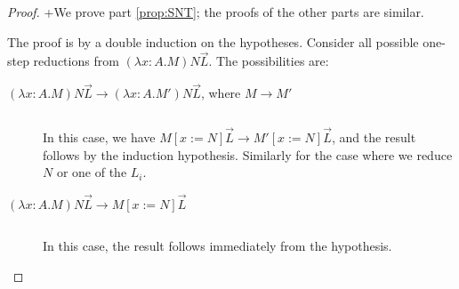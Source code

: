 \begin{proof}
+We prove part \ref{prop:SNT}; the proofs of the other parts are similar.

The proof is by a double induction on the hypotheses.  Consider all possible one-step reductions from $(\lambda x:A.M) N \vec{L}$.  The possibilities are:
\begin{description}
\item[$(\lambda x:A.M) N \vec{L} \rightarrow (\lambda x:A.M')N \vec{L}$, where $M \rightarrow M'$]
$ $

In this case, we have $M[x:=N] \vec{L} \rightarrow M'[x:=N] \vec{L}$, and the result follows by the induction hypothesis.  Similarly for the case
where we reduce $N$ or one of the $L_i$.
\item[$(\lambda x:A.M)N \vec{L} \rightarrow M{[x:=N]} \vec{L}$]
$ $

In this case, the result follows immediately from the hypothesis.
\end{description}
\end{proof}

